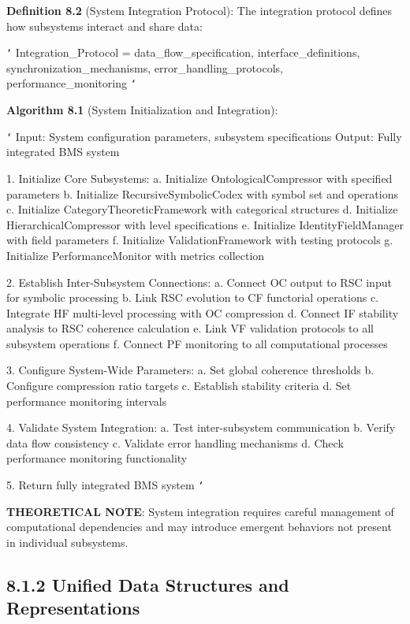 \textbf{Definition 8.2} (System Integration Protocol): The integration protocol defines how subsystems interact and share data:

\texttt{`}
Integration_Protocol = {
    data_flow_specification,
    interface_definitions,
    synchronization_mechanisms,
    error_handling_protocols,
    performance_monitoring
}
\texttt{`}

\textbf{Algorithm 8.1} (System Initialization and Integration):

\texttt{`}
Input: System configuration parameters, subsystem specifications
Output: Fully integrated BMS system

1. Initialize Core Subsystems:
   a. Initialize OntologicalCompressor with specified parameters
   b. Initialize RecursiveSymbolicCodex with symbol set and operations
   c. Initialize CategoryTheoreticFramework with categorical structures
   d. Initialize HierarchicalCompressor with level specifications
   e. Initialize IdentityFieldManager with field parameters
   f. Initialize ValidationFramework with testing protocols
   g. Initialize PerformanceMonitor with metrics collection
   
2. Establish Inter-Subsystem Connections:
   a. Connect OC output to RSC input for symbolic processing
   b. Link RSC evolution to CF functorial operations
   c. Integrate HF multi-level processing with OC compression
   d. Connect IF stability analysis to RSC coherence calculation
   e. Link VF validation protocols to all subsystem operations
   f. Connect PF monitoring to all computational processes
   
3. Configure System-Wide Parameters:
   a. Set global coherence thresholds
   b. Configure compression ratio targets
   c. Establish stability criteria
   d. Set performance monitoring intervals
   
4. Validate System Integration:
   a. Test inter-subsystem communication
   b. Verify data flow consistency
   c. Validate error handling mechanisms
   d. Check performance monitoring functionality
   
5. Return fully integrated BMS system
\texttt{`}

\textbf{THEORETICAL NOTE}: System integration requires careful management of computational dependencies and may introduce emergent behaviors not present in individual subsystems.

\subsection{8.1.2 Unified Data Structures and Representations}

